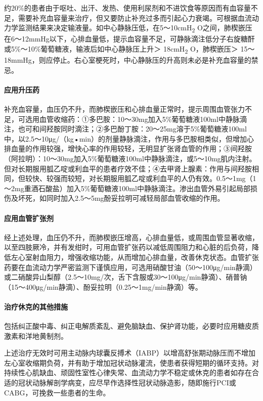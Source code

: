 约20\%的患者由于呕吐、出汗、发热、使用利尿剂和不进饮食等原因而有血容量不足，需要补充血容量来治疗，但又要防止补充过多而引起心力衰竭。可根据血流动力学监测结果来决定输液量。如中心静脉压低，在5～10cmH\textsubscript{2}
O之间，肺楔嵌压在6～12mmHg以下，心排血量低，提示血容量不足，可静脉滴注低分子右旋糖酐或5\%～10\%葡萄糖液，输液后如中心静脉压上升＞
18cmH\textsubscript{2} O，肺楔嵌压＞
15～18mmHg，则应停止。右心室梗死时，中心静脉压的升高则未必是补充血容量的禁忌。

\paragraph{应用升压药}

补充血容量，血压仍不升，而肺楔嵌压和心排血量正常时，提示周围血管张力不足，可选用血管收缩药：①多巴胺：10～30mg加入5\%葡萄糖液100ml中静脉滴注，也可和间羟胺同时滴注；②多巴酚丁胺：20～25mg溶于5\%葡萄糖液100ml中，以2.5～10μg/（kg•min）的剂量静脉滴注，作用与多巴胺相类似，但增加心排血量的作用较强，增快心率的作用较轻，无明显扩张肾血管的作用；③间羟胺（阿拉明）：10～30mg加入5\%葡萄糖液100ml中静脉滴注，或5～10mg肌内注射。但对长期服用胍乙啶或利血平的患者疗效不佳；④去甲肾上腺素：作用与间羟胺相同，但较快、较强而较短，对长期服用胍乙啶或利血平的人仍有效。0.5～1mg（1～2mg重酒石酸盐）加入5\%葡萄糖液100ml中静脉滴注。渗出血管外易引起局部损伤及坏死，如同时加入2.5～5mg酚妥拉明可减轻局部血管收缩的作用。

\paragraph{应用血管扩张剂}

经上述处理，血压仍不升，而肺楔嵌压增高，心排血量低，或周围血管显著收缩，以至四肢厥冷，并有发绀时，可用血管扩张药以减低周围阻力和心脏的后负荷，降低左心室射血阻力，增强收缩功能，从而增加心排血量，改善休克状态。血管扩张药要在血流动力学严密监测下谨慎应用，可选用硝酸甘油（50～100μg/min静滴）或二硝酸异山梨醇（2.5～10mg/次，舌下含服或30～100μg/min静滴）、硝普钠（15～400μg/min静滴）、酚妥拉明（0.25～1mg/min静滴）等。

\paragraph{治疗休克的其他措施}

包括纠正酸中毒、纠正电解质紊乱、避免脑缺血、保护肾功能，必要时应用糖皮质激素和洋地黄制剂。

上述治疗无效时可用主动脉内球囊反搏术（IABP）以增高舒张期动脉压而不增加左心室收缩期负荷，并有助于增加冠状动脉灌流，使患者获得短期的循环支持。对持续性心肌缺血、顽固性室性心律失常、血流动力学不稳定或休克的患者如存在合适的冠状动脉解剖学病变，应尽早作选择性冠状动脉造影，随即施行PCI或CABG，可挽救一些患者的生命。

